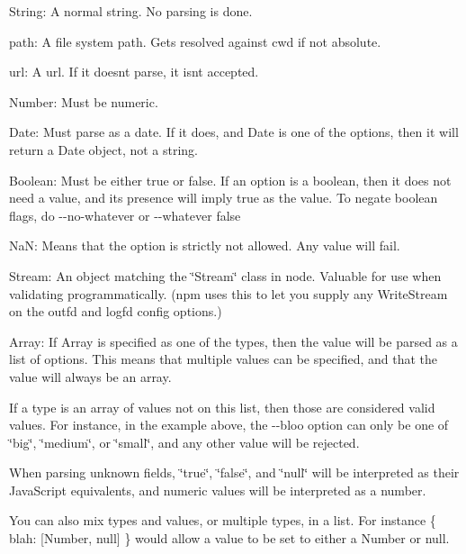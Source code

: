 \begin{DoxyItemize}
\item String\+: A normal string. No parsing is done.
\item path\+: A file system path. Gets resolved against cwd if not absolute.
\item url\+: A url. If it doesn\textquotesingle{}t parse, it isn\textquotesingle{}t accepted.
\item Number\+: Must be numeric.
\item Date\+: Must parse as a date. If it does, and {\ttfamily Date} is one of the options, then it will return a Date object, not a string.
\item Boolean\+: Must be either {\ttfamily true} or {\ttfamily false}. If an option is a boolean, then it does not need a value, and its presence will imply {\ttfamily true} as the value. To negate boolean flags, do {\ttfamily -\/-\/no-\/whatever} or {\ttfamily -\/-\/whatever false}
\item NaN\+: Means that the option is strictly not allowed. Any value will fail.
\item Stream\+: An object matching the \char`\"{}\+Stream\char`\"{} class in node. Valuable for use when validating programmatically. (npm uses this to let you supply any Write\+Stream on the {\ttfamily outfd} and {\ttfamily logfd} config options.)
\item Array\+: If {\ttfamily Array} is specified as one of the types, then the value will be parsed as a list of options. This means that multiple values can be specified, and that the value will always be an array.
\end{DoxyItemize}

If a type is an array of values not on this list, then those are considered valid values. For instance, in the example above, the {\ttfamily -\/-\/bloo} option can only be one of {\ttfamily \char`\"{}big\char`\"{}}, {\ttfamily \char`\"{}medium\char`\"{}}, or {\ttfamily \char`\"{}small\char`\"{}}, and any other value will be rejected.

When parsing unknown fields, {\ttfamily \char`\"{}true\char`\"{}}, {\ttfamily \char`\"{}false\char`\"{}}, and {\ttfamily \char`\"{}null\char`\"{}} will be interpreted as their Java\+Script equivalents, and numeric values will be interpreted as a number.

You can also mix types and values, or multiple types, in a list. For instance {\ttfamily \{ blah\+: \mbox{[}Number, null\mbox{]} \}} would allow a value to be set to either a Number or null.

